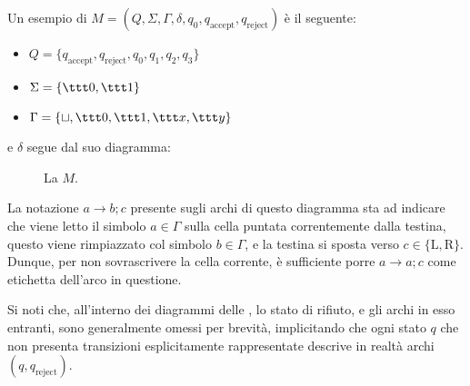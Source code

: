 \documentclass[a4paper, 12pt]{report}
\begin{document}
    \begin{example}[\TM]
        \label{tm ex}
        Un esempio di \TM $M = (Q, \Sigma, \Gamma, \delta, q_0, q_\mathrm{accept}, q_\mathrm{reject})$ è il seguente:

        \begin{itemize}
            \item $Q = \{q_\mathrm{accept}, q_\mathrm{reject}, q_0, q_1, q_2, q_3\}$
            \item $\Sigma = \{\ttt 0, \ttt 1\}$
            \item $\Gamma = \{\sqcup, \ttt 0, \ttt 1, \ttt x, \ttt y\}$
        \end{itemize}

        e $\delta$ segue dal suo diagramma:

        \begin{figure}[H]
            \centering
             \caption{La \TM $M$.}
         \end{figure}
         
         La notazione $a \to b;c$ presente sugli archi di questo diagramma sta ad indicare che viene letto il simbolo $a \in \Gamma$ sulla cella puntata correntemente dalla testina, questo viene rimpiazzato col simbolo $b \in \Gamma$, e la testina si sposta verso $c \in \{\mathrm L, \mathrm R\}$. Dunque, per non sovrascrivere la cella corrente, è sufficiente porre $a \to a; c$ come etichetta dell'arco in questione.
         
         Si noti che, all'interno dei diagrammi delle \TM, lo stato di rifiuto, e gli archi in esso entranti, sono generalmente omessi per brevità, implicitando che ogni stato $q$ che non presenta transizioni esplicitamente rappresentate descrive in realtà archi $(q, q_\mathrm{reject})$.
    \end{example}
\end{document}

